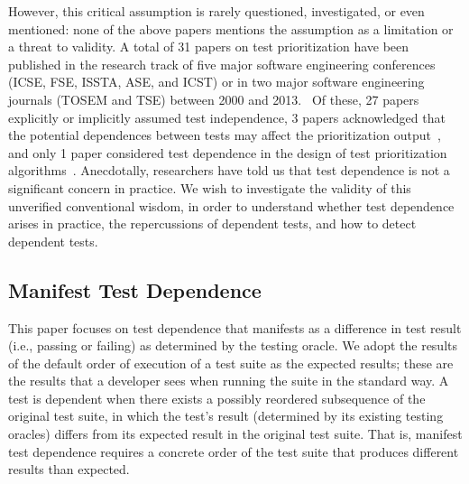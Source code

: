 However, this critical assumption is
rarely questioned, investigated, or even mentioned:
none of the above papers mentions the assumption
as a limitation or a threat to validity.
A total of 31 papers on test prioritization have been  
published in the research track of five major software engineering conferences
(ICSE, FSE, ISSTA, ASE, and ICST) or in two major software engineering journals
(TOSEM and TSE) between 2000 and 2013.~\cite{alltestprior}
Of these,
27 papers explicitly or implicitly assumed test independence,
3 papers acknowledged that the potential dependences between tests
may affect the prioritization output~\cite{Kim:2002:HTP:581339.581357,
Qu:2008:CRT, Rothermel:2004:TSC},
and only 1 paper considered test dependence in the design of
test prioritization algorithms~\cite{10.1109/TSE.2012.26}.
Anecdotally, researchers have told us that test dependence
is not a significant concern in practice.
We wish to investigate the validity of this unverified conventional wisdom,
in order to understand whether test dependence arises in practice, 
the repercussions of dependent tests, and how to 
detect dependent tests.


\subsection{Manifest Test Dependence}

This paper focuses on test
dependence that manifests as a
difference in test result (i.e., passing or failing) as determined by the testing oracle.
We adopt the results of the default
order of execution of a test suite as the
expected results; these are the results that a developer sees when running
the suite in the standard way. A test is dependent when there exists a possibly
reordered subsequence of the original test suite, in which
the test's result (determined by its existing testing
oracles) differs from its expected result in the
original test suite.
%
That is, manifest test dependence
requires a concrete order of the test suite that
produces {different} results than expected.  
%
%



